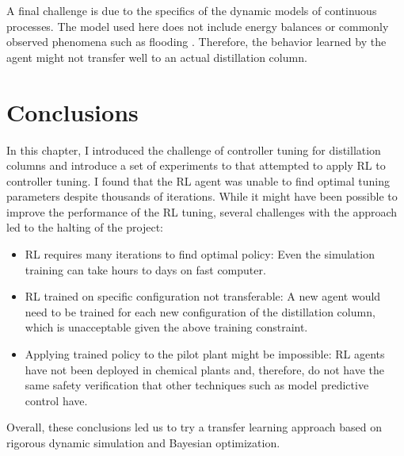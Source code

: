 A final challenge is due to the specifics of the dynamic models of continuous processes. The model used here does not include energy balances or commonly observed phenomena such as flooding \cite{Nooraii1998}. Therefore, the behavior learned by the agent might not transfer well to an actual distillation column.

\section{Conclusions}

In this chapter, I introduced the challenge of controller tuning for distillation columns and introduce a set of experiments to that attempted to apply RL to controller tuning. I found that the RL agent was unable to find optimal tuning parameters despite thousands of iterations. While it might have been  possible to improve the performance of the RL tuning, several challenges with the approach led to the halting of the project:

\begin{itemize}
    \item RL requires many iterations to find optimal policy: Even the simulation training can take hours to days on fast computer.
    \item RL trained on specific configuration not transferable: A new agent would need to be trained for each new configuration of the distillation column, which is unacceptable given the above training constraint.
    \item Applying trained policy to the pilot plant might be impossible: RL agents have not been deployed in chemical plants and, therefore, do not have the same safety verification that other techniques such as model predictive control have. 
\end{itemize}

 Overall, these conclusions led us to try a transfer learning approach based on rigorous dynamic simulation and Bayesian optimization.
